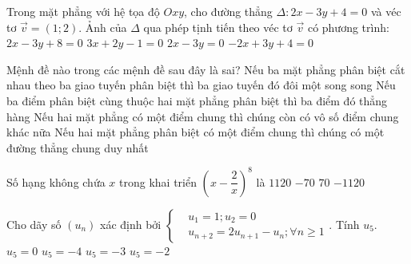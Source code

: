 \begin{ex}%
Trong mặt phẳng với hệ tọa độ $ Oxy$, cho đường thẳng $ \Delta:2x-3y+4=0$ và véc tơ $\overrightarrow{v}=(1;2)$. Ảnh của $ \Delta $ qua phép tịnh tiến theo véc tơ $\overrightarrow{v}$ có phương trình:
\choice
	{\True $2x-3y+8=0$}
	{$3x+2y-1=0$}
	{$2x-3y=0$}
	{$-2x+3y+4=0$}
\end{ex}
\begin{ex}%
Mệnh đề nào trong các mệnh đề sau đây là sai?
\choice
	{\True Nếu ba mặt phẳng phân biệt cắt nhau theo ba giao tuyến phân biệt thì ba giao tuyến đó đôi một song song}
	{Nếu ba điểm phân biệt cùng thuộc hai mặt phẳng phân biệt thì ba điểm đó thẳng hàng}
	{Nếu hai mặt phẳng có một điểm chung thì chúng còn có vô số điểm chung khác nữa}
	{Nếu hai mặt phẳng phân biệt có một điểm chung thì chúng có một đường thẳng chung duy nhất}
\end{ex}
\begin{ex}%
Số hạng không chứa $x$ trong khai triển ${\left(x-\dfrac{2}{x}\right)}^8$ là
\choice
	{\True $1120$}
	{$-70$}
	{$70$}
	{$-1120$}
\end{ex}
\begin{ex}%
Cho dãy số $\left(u_n\right)$ xác định bởi $\left\{\begin{aligned}& u_1=1;u_2=0 \\ & u_{n+2}=2u_{n+1}-u_n;\forall n\geqslant 1 \end{aligned}\right. $. Tính $u_5$.
\choice
	{$u_5=0$}
	{$u_5=-4$}
	{\True $u_5=-3$}
	{$u_5=-2$}
\end{ex}
